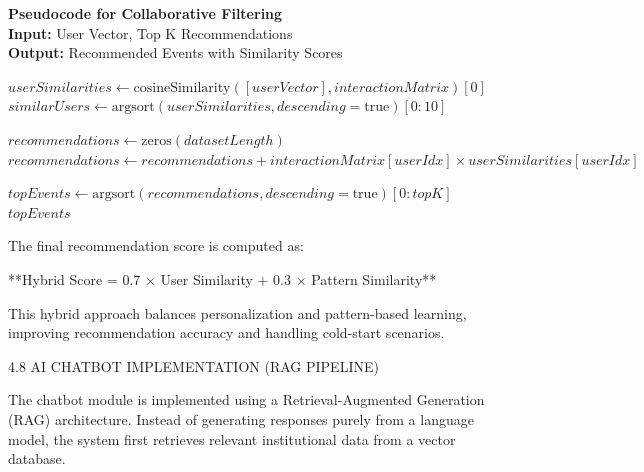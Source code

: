 \noindent\textbf{Pseudocode for Collaborative Filtering} 
\vspace{.2em} \\
\noindent\textbf{Input:} User Vector, Top K Recommendations\\
\noindent\textbf{Output:} Recommended Events with Similarity Scores
\begin{algorithmic}[1]
    \State $userSimilarities \gets \text{cosineSimilarity}([userVector], interactionMatrix)[0]$
    \State $similarUsers \gets \text{argsort}(userSimilarities, descending=\text{true})[0:10]$
    
    \State $recommendations \gets \text{zeros}(datasetLength)$
            \State $recommendations \gets recommendations + interactionMatrix[userIdx] \times userSimilarities[userIdx]$
        \EndIf
    \EndFor
    
    \State $topEvents \gets \text{argsort}(recommendations, descending=\text{true})[0:topK]$
    \State \Return $topEvents$
\EndFunction
\end{algorithmic}

The final recommendation score is computed as:

**Hybrid Score = 0.7 × User Similarity + 0.3 × Pattern Similarity**

This hybrid approach balances personalization and pattern-based learning, improving recommendation accuracy and handling cold-start scenarios.

4.8 AI CHATBOT IMPLEMENTATION (RAG PIPELINE)

The chatbot module is implemented using a Retrieval-Augmented Generation (RAG) architecture. Instead of generating responses purely from a language model, the system first retrieves relevant institutional data from a vector database.

